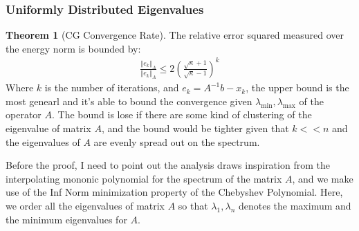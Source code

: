 \documentclass[]{article}
\theoremstyle{definition}
\newtheorem{theorem}{Theorem}  %
\begin{document}
        \subsubsection{Uniformly Distributed Eigenvalues}
            \begin{theorem}[CG Convergence Rate]
                The relative error squared measured over the energy norm is bounded by: 
                \begin{align}
                    \frac{\Vert e_k\Vert_A}{\Vert e_k\Vert_A}
                    \le 2 \left(
                            \frac{\sqrt{\kappa} + 1}{\sqrt{\kappa} - 1}
                    \right)^k
                \end{align}
                Where $k$ is the number of iterations, and $e_k = A^{-1}b - x_k$, the upper bound is the most genearl and it's able to bound the convergence given $\lambda_{\min}, \lambda_{\max}$ of the operator $A$. The bound is lose if there are some kind of clustering of the eigenvalue of matrix $A$, and the bound would be tighter given that $k<<n$ and the eigenvalues of $A$ are evenly spread out on the spectrum. 
            \end{theorem}
            Before the proof, I need to point out the analysis draws inspiration from the interpolating mononic polynomial for the spectrum of the matrix $A$, and we make use of the Inf Norm minimization property of the Chebyshev Polynomial. Here, we order all the eigenvalues of matrix $A$ so that $\lambda_1, \lambda_n$ denotes the maximum and the minimum eigenvalues for $A$. 
\end{document}
